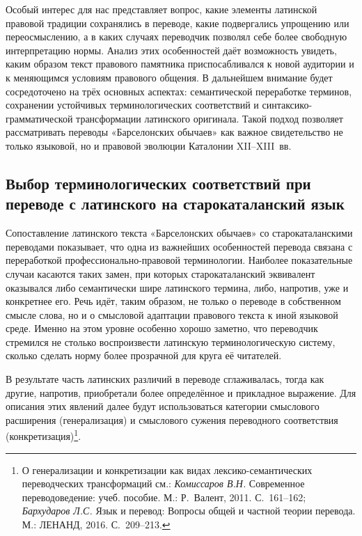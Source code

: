 Особый интерес для нас представляет вопрос, какие элементы латинской правовой традиции сохранялись в переводе, какие подвергались упрощению или переосмыслению, а в каких случаях переводчик позволял себе более свободную интерпретацию нормы. Анализ этих особенностей даёт возможность увидеть, каким образом текст правового памятника приспосабливался к новой аудитории и к меняющимся условиям правового общения. В дальнейшем внимание будет сосредоточено на трёх основных аспектах: семантической переработке терминов, сохранении устойчивых терминологических соответствий и синтаксико-грамматической трансформации латинского оригинала. Такой подход позволяет рассматривать переводы «Барселонских обычаев» как важное свидетельство не только языковой, но и правовой эволюции Каталонии XII--XIII~вв.

\subsection{Выбор терминологических соответствий при переводе с латинского на старокаталанский язык}

Сопоставление латинского текста «Барселонских обычаев» со старокаталанскими переводами показывает, что одна из важнейших особенностей перевода связана с переработкой профессионально-правовой терминологии. Наиболее показательные случаи касаются таких замен, при которых старокаталанский эквивалент оказывался либо семантически шире латинского термина, либо, напротив, уже и конкретнее его. Речь идёт, таким образом, не только о переводе в собственном смысле слова, но и о смысловой адаптации правового текста к иной языковой среде. Именно на этом уровне особенно хорошо заметно, что переводчик стремился не столько воспроизвести латинскую терминологическую систему, сколько сделать норму более прозрачной для круга её читателей.

В результате часть латинских различий в переводе сглаживалась, тогда как другие, напротив, приобретали более определённое и прикладное выражение. Для описания этих явлений далее будут использоваться категории смыслового расширения (генерализация) и смыслового сужения переводного соответствия (конкретизация)\footnote{О генерализации и конкретизации как видах лексико-семантических переводческих трансформаций см.: \emph{Комиссаров В.Н.} Современное переводоведение: учеб. пособие. М.: Р.~Валент, 2011. С.~161--162; \emph{Бархударов Л.С. }Язык и перевод: Вопросы общей и частной теории перевода. М.: ЛЕНАНД, 2016. С.~209--213.}.

